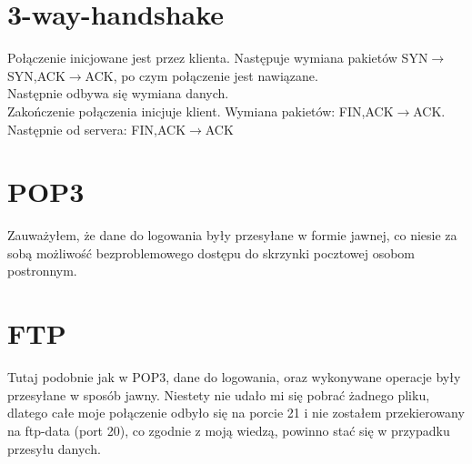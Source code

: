 \documentclass[a4paper,12pt]{article}
\begin{document}
\section{3-way-handshake}
Połączenie inicjowane jest przez klienta. Następuje wymiana pakietów SYN$\rightarrow$SYN,ACK$\rightarrow$ACK, po czym połączenie jest nawiązane.\\
Następnie odbywa się wymiana danych.\\
Zakończenie połączenia inicjuje klient. Wymiana pakietów: FIN,ACK$\rightarrow$ACK. Następnie od servera: FIN,ACK$\rightarrow$ACK
\section{POP3}
Zauważyłem, że dane do logowania były przesyłane w formie jawnej, co niesie za sobą możliwość bezproblemowego dostępu do skrzynki pocztowej osobom postronnym.
\section{FTP}
Tutaj podobnie jak w POP3, dane do logowania, oraz wykonywane operacje były przesyłane w sposób jawny.
Niestety nie udało mi się pobrać żadnego pliku, dlatego całe moje połączenie odbyło się na porcie 21 i nie zostałem przekierowany na ftp-data (port 20), co zgodnie z moją wiedzą, powinno stać się w przypadku przesyłu danych.
\end{document}
